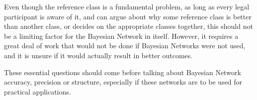 \begin{itemize}
Even though the reference class is a fundamental problem, as long as every legal participant is aware of it, and can argue about why some reference class is better than another class, or decides on the appropriate classes together, this should not be a limiting factor for the Bayesian Network in itself. However, it requires a great deal of work that would not be done if Bayesian Networks were not used, and it is unsure if it would actually result in better outcomes.

\end{itemize}

These essential questions should come before talking about Bayesian Network accuracy, precision or structure, especially if these networks are to be used for practical applications.
